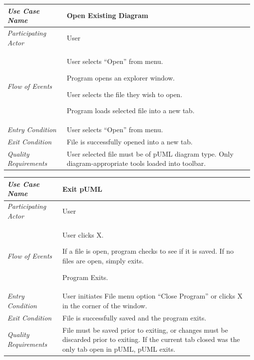 \documentclass[twoside,letterpaper]{article}
\newenvironment{my_enumerate}{
\begin{enumerate}
  \setlength{\itemsep}{1pt}
  \setlength{\parskip}{0pt}
  \setlength{\parsep}{0pt}}{\end{enumerate}
}
\begin{document}
\bigskip

\begin{flushleft}
\tablehead{}
\begin{tabular}{|m{2.0in} m{5.0in}|}
\hline
{\bfseries\emph{Use Case Name}}
& {\bfseries Open Existing Diagram}
\\\hline
\emph{Participating Actor}
& User
\\\hline
\emph{Flow of Events}
& \begin{my_enumerate}
\item User selects ``Open'' from menu.
\item Program opens an explorer window.
\item User selects the file they wish to open.
\item Program loads selected file into a new tab.
\end{my_enumerate}
\\\hline
\emph{Entry Condition}
& User selects ``Open'' from menu.
\\\hline
\emph{Exit Condition}
& File is successfully opened into a new tab.
\\\hline
\emph{Quality Requirements}
& User selected file must be of pUML diagram type.\newline
  Only diagram-appropriate tools loaded into toolbar.
\\\hline
\end{tabular}
\end{flushleft}

\bigskip


\begin{flushleft}
\tablehead{}
\begin{tabular}{|m{2.0in} m{5.0in}|}
\hline
{\bfseries\emph{Use Case Name}}
& {\bfseries Exit pUML}
\\\hline
\emph{Participating Actor}
& User
\\\hline
\emph{Flow of Events}
& \begin{my_enumerate}
\item User clicks X.
\item If a file is open, program checks to see if it is saved.  If no files are open, simply exits.
\item Program Exits.
\end{my_enumerate}
\\\hline
\emph{Entry Condition}
&
User initiates File menu option ``Close Program'' or clicks X in the corner of the window.
\\\hline
\emph{Exit Condition}
& File is successfully saved and the program exits.
\\\hline
\emph{Quality Requirements}
& File must be saved prior to exiting, or changes must be discarded prior to exiting. \newline
  If the current tab closed was the only tab open in pUML, pUML exits.
\\\hline
\end{tabular}
\end{flushleft}
\bigskip
\end{document}
